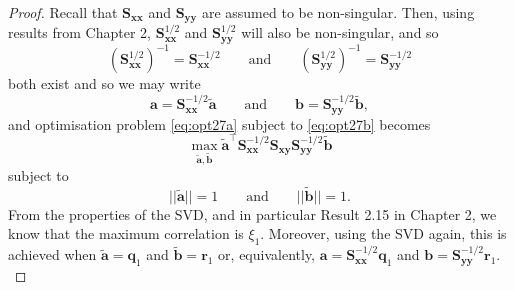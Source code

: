 \documentclass[]{book}
\theoremstyle{definition}
\theoremstyle{definition}
\theoremstyle{definition}
\theoremstyle{remark}
\begin{document}
\begin{proof}
Recall that \(\boldsymbol S_{\boldsymbol x\boldsymbol x}\) and \(\boldsymbol S_{\boldsymbol y\boldsymbol y}\) are assumed to be non-singular. Then, using results from Chapter 2, \(\boldsymbol S_{\boldsymbol x\boldsymbol x}^{1/2}\) and \(\boldsymbol S_{\boldsymbol y\boldsymbol y}^{1/2}\) will also be non-singular, and so
\[
(\boldsymbol S_{\boldsymbol x\boldsymbol x}^{1/2})^{-1}=\boldsymbol S_{\boldsymbol x\boldsymbol x}^{-1/2} \qquad \text{and} \qquad (\boldsymbol S_{\boldsymbol y\boldsymbol y}^{1/2})^{-1}=\boldsymbol S_{\boldsymbol y\boldsymbol y}^{-1/2}
\]
both exist and so we may write
\[
\boldsymbol a=\boldsymbol S_{\boldsymbol x\boldsymbol x}^{-1/2}\tilde{\boldsymbol a} \qquad \text{and} \qquad \boldsymbol b=\boldsymbol S_{\boldsymbol y\boldsymbol y}^{-1/2} \tilde{\boldsymbol b},
\]
and optimisation problem \eqref{eq:opt27a} subject to \eqref{eq:opt27b} becomes
\[
\max_{\tilde{\boldsymbol a}, \tilde{\boldsymbol b}}
\tilde{\boldsymbol a}^\top \boldsymbol S_{\boldsymbol x\boldsymbol x}^{-1/2}\boldsymbol S_{\boldsymbol x\boldsymbol y}\boldsymbol S_{\boldsymbol y\boldsymbol y}^{-1/2} \tilde{\boldsymbol b}
\]
subject to
\[
\vert \vert \tilde{\boldsymbol a} \vert \vert =1 \qquad \text{and} \qquad \vert \vert \tilde{\boldsymbol b}\vert \vert=1.
\]
From the properties of the SVD, and in particular Result 2.15 in Chapter 2, we know that the maximum correlation is \(\xi_1\). Moreover, using the SVD again, this is achieved when \(\tilde{\boldsymbol a}={\mathbf q}_1\) and \(\tilde{\boldsymbol b}={\mathbf r}_1\) or, equivalently, \(\boldsymbol a=\boldsymbol S_{\boldsymbol x\boldsymbol x}^{-1/2}{\mathbf q}_1\) and \(\boldsymbol b=\boldsymbol S_{\boldsymbol y\boldsymbol y}^{-1/2}{\mathbf r}_1\).\\
\end{proof}
\end{document}
